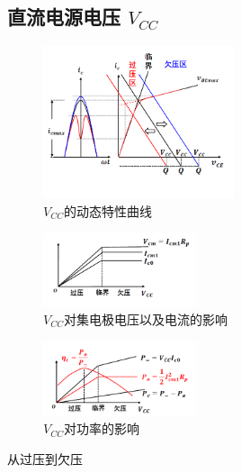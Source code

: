 \documentclass[a4paper]{report}
\begin{document}
\subsection{直流电源电压 $V_{CC}$}
\begin{figure}[H]
  \centering
  \includegraphics[width=0.5\textwidth]{power_amp_graph_vcc_1.png}
  \caption{$V_{CC}$的动态特性曲线}
  \end{figure}
  \begin{figure}[H]
  \centering
  \includegraphics[width=0.4\textwidth]{power_amp_graph_vcc_2.png}
  \caption{$V_{CC}$对集电极电压以及电流的影响}
  \end{figure}
  \begin{figure}[H]
  \centering
  \includegraphics[width=0.4\textwidth]{power_amp_graph_vcc_3.png}
  \caption{$V_{CC}$对功率的影响}
  \end{figure}
从过压到欠压
\end{document}
